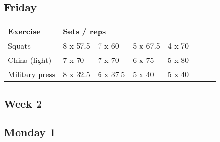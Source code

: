 \documentclass[12pt, a4paper]{article}%
\begin{document}
  \subsection*{\hspace{0.5em} Friday }


  \begin{tabular}{l|lllllll}
  \hspace{0.75em} \textbf{Exercise} & \multicolumn{ 7 }{l}{ \textbf{Sets / reps} } \\ \hline

            \hspace{0.75em} Squats
            & 8 x 57.5
            & 7 x 60
            & 5 x 67.5
            & 4 x 70
            & 
            & 
            & 
            \\


            \hspace{0.75em} Chins (light)
            & 7 x 70
            & 7 x 70
            & 6 x 75
            & 5 x 80
            & 
            & 
            & 
            \\


            \hspace{0.75em} Military press
            & 8 x 32.5
            & 6 x 37.5
            & 5 x 40
            & 5 x 40
            & 
            & 
            & 
            \\


  \end{tabular}


\clearpage \subsection*{\hspace{0.25em} Week 2 }
  \subsection*{\hspace{0.5em} Monday 1 }
\end{document}
